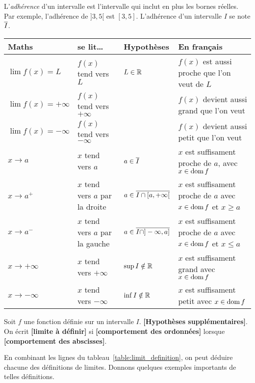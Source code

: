 \documentclass[main.tex]{subfiles}
\begin{document}
L'\emph{adhérence} d'un intervalle est l'intervalle qui inclut en plus les bornes réelles.
Par exemple, l'adhérence de $]3, 5[$ est $[3, 5]$.
L'adhérence d'un intervalle $I$ se note $\overline{I}$.

\begin{sidewaystable}
    \centering
    \caption{Tableau récapitulatif pour les définitions de limite}
    \label{table:limit_definition}
    \begin{tabular}
        {l l l l}
        \toprule
        Maths & se lit\dots & Hypothèses & En français \\ \midrule
        $\lim f(x) = L$ & $f(x)$ tend vers $L$ & $L \in \mathbb{R}$ & $f(x)$ est aussi proche que l'on veut de $L$ \\
        $\lim f(x) = +\infty$ & $f(x)$ tend vers $+\infty$ & & $f(x)$ devient aussi grand que l'on veut\\
        $\lim f(x) = -\infty$ & $f(x)$ tend vers $-\infty$ & & $f(x)$ devient aussi petit que l'on veut\\
        $x \to a$ & $x$ tend vers $a$ & $a \in \overline{I}$ & $x$ est suffisament proche de $a$, avec $x \in \operatorname{dom} f$\\
        $x \to a^+$ & $x$ tend vers $a$ par la droite & $a \in \overline{I \cap [a, +\infty[}$ & $x$ est suffisament proche de $a$ avec $x \in \operatorname{dom} f$ et $x \geq a$\\
        $x \to a^-$ & $x$ tend vers $a$ par la gauche & $a \in \overline{I \cap ]-\infty, a]}$ & $x$ est suffisament proche de $a$ avec $x \in \operatorname{dom} f$ et $x \leq a$\\
        $x \to +\infty$ & $x$ tend vers $+\infty$ & $\sup I \notin \mathbb{R}$ & $x$ est suffisament grand avec $x \in \operatorname{dom} f$\\
        $x \to -\infty$ & $x$ tend vers $-\infty$ & $\inf I \notin \mathbb{R}$ & $x$ est suffisament petit avec $x \in \operatorname{dom} f$\\
        \bottomrule
    \end{tabular}
\end{sidewaystable}

\begin{definition}
    [Limite]

    Soit $f$ une fonction définie sur un intervalle $I$.
    \textbf{[Hypothèses supplémentaires]}.
    On écrit \textbf{[limite à définir]}
    si \textbf{[comportement des ordonnées]}
    lorsque \textbf{[comportement des abscisses]}.
\end{definition}

En combinant les lignes du tableau~\ref{table:limit_definition},
on peut déduire chacune des définitions de limites.
Donnons quelques exemples importants de telles définitions.
\end{document}
